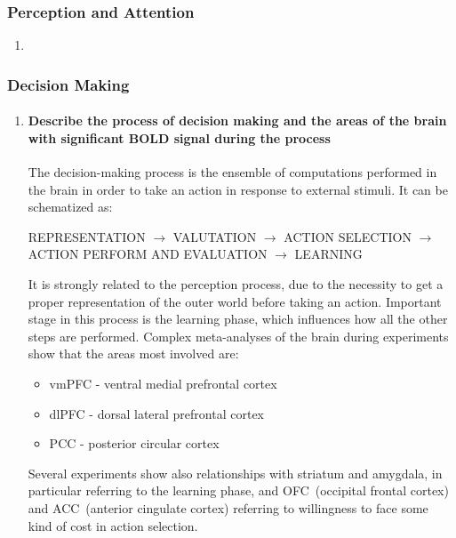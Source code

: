 \documentclass[12pt,article,oneside,a4paper]{memoir}
\begin{document}
\subsubsection{Perception and Attention}
\begin{enumerate}
\item 
\end{enumerate}

\subsubsection{Decision Making}
\begin{enumerate}
\item \paragraph{Describe the process of decision making and the areas of the
brain with significant BOLD signal during the process}

The decision-making process is the ensemble of computations performed in the
brain in order to take an action in response to external stimuli.
It can be schematized as:

REPRESENTATION $\rightarrow$ VALUTATION $\rightarrow$ ACTION SELECTION
$\rightarrow$ ACTION PERFORM AND EVALUATION $\rightarrow$ LEARNING

It is strongly related to the perception process, due to the necessity to get a
proper representation of the outer world before taking an action. Important
stage in this process is the learning phase, which influences how all the other
steps are performed. Complex meta-analyses of the brain during experiments show
that the areas most involved are:

\begin{itemize}
\item vmPFC - ventral medial prefrontal cortex
\item dlPFC - dorsal lateral prefrontal cortex
\item PCC - posterior circular cortex
\end{itemize}

Several experiments show also relationships with striatum and amygdala, in
particular referring to the learning phase, and OFC~(occipital frontal cortex)
and ACC~(anterior cingulate cortex) referring to willingness to face some kind
of cost in action selection.


\end{enumerate}
\end{document}
